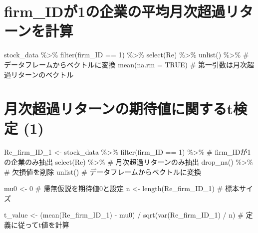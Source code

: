 \documentclass[
  letterpaper,
  DIV=11,
  numbers=noendperiod]{scrreprt}
\newenvironment{Shaded}{\begin{snugshade}}{\end{snugshade}}
\newcommand{\AttributeTok}[1]{\textcolor[rgb]{0.40,0.45,0.13}{#1}}
\newcommand{\CommentTok}[1]{\textcolor[rgb]{0.37,0.37,0.37}{#1}}
\newcommand{\ConstantTok}[1]{\textcolor[rgb]{0.56,0.35,0.01}{#1}}
\newcommand{\DecValTok}[1]{\textcolor[rgb]{0.68,0.00,0.00}{#1}}
\newcommand{\FunctionTok}[1]{\textcolor[rgb]{0.28,0.35,0.67}{#1}}
\newcommand{\NormalTok}[1]{\textcolor[rgb]{0.00,0.23,0.31}{#1}}
\newcommand{\OtherTok}[1]{\textcolor[rgb]{0.00,0.23,0.31}{#1}}
\newcommand{\SpecialCharTok}[1]{\textcolor[rgb]{0.37,0.37,0.37}{#1}}
\begin{document}
\section{firm\_IDが1の企業の平均月次超過リターンを計算}\label{firm_idux304c1ux306eux4f01ux696dux306eux5e73ux5747ux6708ux6b21ux8d85ux904eux30eaux30bfux30fcux30f3ux3092ux8a08ux7b97}

\begin{Shaded}
\begin{Highlighting}[]
\NormalTok{stock\_data }\SpecialCharTok{\%\textgreater{}\%} 
  \FunctionTok{filter}\NormalTok{(firm\_ID }\SpecialCharTok{==} \DecValTok{1}\NormalTok{) }\SpecialCharTok{\%\textgreater{}\%} 
  \FunctionTok{select}\NormalTok{(Re) }\SpecialCharTok{\%\textgreater{}\%}
  \FunctionTok{unlist}\NormalTok{() }\SpecialCharTok{\%\textgreater{}\%} \CommentTok{\# データフレームからベクトルに変換}
  \FunctionTok{mean}\NormalTok{(}\AttributeTok{na.rm =} \ConstantTok{TRUE}\NormalTok{) }\CommentTok{\# 第一引数は月次超過リターンのベクトル}
\end{Highlighting}
\end{Shaded}

\section{月次超過リターンの期待値に関するt検定
(1)}\label{ux6708ux6b21ux8d85ux904eux30eaux30bfux30fcux30f3ux306eux671fux5f85ux5024ux306bux95a2ux3059ux308btux691cux5b9a-1}

\begin{Shaded}
\begin{Highlighting}[]
\NormalTok{Re\_firm\_ID\_1 }\OtherTok{\textless{}{-}}\NormalTok{ stock\_data }\SpecialCharTok{\%\textgreater{}\%}
  \FunctionTok{filter}\NormalTok{(firm\_ID }\SpecialCharTok{==} \DecValTok{1}\NormalTok{) }\SpecialCharTok{\%\textgreater{}\%} \CommentTok{\# firm\_IDが1の企業のみ抽出}
  \FunctionTok{select}\NormalTok{(Re) }\SpecialCharTok{\%\textgreater{}\%} \CommentTok{\# 月次超過リターンのみ抽出}
  \FunctionTok{drop\_na}\NormalTok{() }\SpecialCharTok{\%\textgreater{}\%} \CommentTok{\# 欠損値を削除}
  \FunctionTok{unlist}\NormalTok{() }\CommentTok{\# データフレームからベクトルに変換}

\NormalTok{mu0 }\OtherTok{\textless{}{-}} \DecValTok{0} \CommentTok{\# 帰無仮説を期待値0と設定}
\NormalTok{n }\OtherTok{\textless{}{-}} \FunctionTok{length}\NormalTok{(Re\_firm\_ID\_1) }\CommentTok{\# 標本サイズ}

\NormalTok{t\_value }\OtherTok{\textless{}{-}}\NormalTok{ (}\FunctionTok{mean}\NormalTok{(Re\_firm\_ID\_1) }\SpecialCharTok{{-}}\NormalTok{ mu0) }\SpecialCharTok{/} \FunctionTok{sqrt}\NormalTok{(}\FunctionTok{var}\NormalTok{(Re\_firm\_ID\_1) }\SpecialCharTok{/}\NormalTok{ n) }\CommentTok{\# 定義に従ってt値を計算}
\end{Highlighting}
\end{Shaded}
\end{document}
